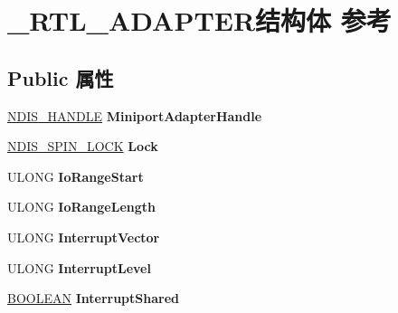 \hypertarget{struct___r_t_l___a_d_a_p_t_e_r}{}\section{\+\_\+\+R\+T\+L\+\_\+\+A\+D\+A\+P\+T\+E\+R结构体 参考}
\label{struct___r_t_l___a_d_a_p_t_e_r}
\subsection*{Public 属性}
\begin{DoxyCompactItemize}
\item 
\mbox{\label{struct___r_t_l___a_d_a_p_t_e_r_a9edb0f5d820c0db27eb4b94e36550d0d}} 
\hyperlink{interfacevoid}{N\+D\+I\+S\+\_\+\+H\+A\+N\+D\+LE} {\bfseries Miniport\+Adapter\+Handle}
\item 
\mbox{\label{struct___r_t_l___a_d_a_p_t_e_r_afb62fb3b51293284e2cf9c96c4ad333c}} 
\hyperlink{struct___n_d_i_s___s_p_i_n___l_o_c_k}{N\+D\+I\+S\+\_\+\+S\+P\+I\+N\+\_\+\+L\+O\+CK} {\bfseries Lock}
\item 
\mbox{\label{struct___r_t_l___a_d_a_p_t_e_r_a3be4ed88a4467bc3e9bdadea7eeeddd1}} 
U\+L\+O\+NG {\bfseries Io\+Range\+Start}
\item 
\mbox{\label{struct___r_t_l___a_d_a_p_t_e_r_aad96e6dc08f0748781196117ab817aa7}} 
U\+L\+O\+NG {\bfseries Io\+Range\+Length}
\item 
\mbox{\label{struct___r_t_l___a_d_a_p_t_e_r_a2d3fe28d3e5c31a32c5851fa63775a4b}} 
U\+L\+O\+NG {\bfseries Interrupt\+Vector}
\item 
\mbox{\label{struct___r_t_l___a_d_a_p_t_e_r_a2b2d335c4173e21698d1cbc9076b9c84}} 
U\+L\+O\+NG {\bfseries Interrupt\+Level}
\item 
\mbox{\label{struct___r_t_l___a_d_a_p_t_e_r_ae21340a6fb38e57e23163a9d47258c35}} 
\hyperlink{_processor_bind_8h_a112e3146cb38b6ee95e64d85842e380a}{B\+O\+O\+L\+E\+AN} {\bfseries Interrupt\+Shared}
\item 

\end{DoxyCompactItemize}
